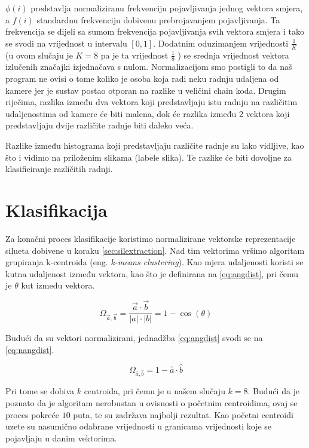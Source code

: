 \documentclass[times, utf8, diplomski]{fer}
\newcommand{\eng}[1]{(eng. \textit{#1})}
\begin{document}
$\phi(i)$ predstavlja normaliziranu frekvenciju pojavljivanja jednog vektora smjera, a $f(i)$ standardnu frekvenciju dobivenu prebrojavanjem pojavljivanja.
Ta frekvencija se dijeli sa sumom frekvencija pojavljivanja svih vektora smjera i tako se svodi na vrijednost u intervalu $[0, 1]$. Dodatnim oduzimanjem vrijednosti $ \frac{1}{K}$ (u ovom slučaju je $K=8$ pa je ta vrijednost $\frac{1}{8}$ ) se srednja vrijednost vektora izlučenih značajki izjednačava s nulom.
Normalizacijom smo postigli to da naš program ne ovisi o tome koliko je osoba koja radi neku radnju udaljena od kamere jer je sustav postao otporan
na razlike u veličini chain koda. Drugim riječima, razlika između dva vektora koji predstavljaju istu radnju na različitim udaljenostima od kamere će biti malena, dok će razlika između 2 vektora koji predstavljaju dvije različite radnje biti daleko veća.


Razlike između histograma koji predstavljaju različite radnje su lako vidljive, kao što i vidimo na priloženim slikama (labele slika). Te razlike će biti dovoljne za klasificiranje različitih radnji.

\section{Klasifikacija}

Za konačni proces klasifikacije koristimo normalizirane vektorske reprezentacije silueta dobivene u koraku \ref{sec:silextraction}. Nad tim vektorima vršimo algoritam grupiranja k-centroida \eng{k-means clustering}. Kao mjera udaljenosti koristi se kutna udaljenost između vektora, kao što je definirana na \ref{eq:angdist}, pri čemu je $\theta$ kut između vektora.

\begin{equation} \label{eq:angdist}
\Omega_{\vec{a},\vec{b}} = \frac{\vec{a} \cdot \vec{b}}{|a| \cdot |b|} = 1 - \cos(\theta)
\end{equation}

Budući da su vektori normalizirani, jednadžba \ref{eq:angdist} svodi se na \ref{eq:nangdist}.

\begin{equation} \label{eq:nangdist}
\Omega_{\hat{a},\hat{b}} = 1 - \hat{a} \cdot \hat{b}
\end{equation}

Pri tome se dobiva $k$ centroida, pri čemu je u našem slučaju $k = 8$. Budući da je poznato da je algoritam nerobustan u ovisnosti o početnim centroidima, ovaj se proces pokreće $10$ puta, te su zadržava najbolji rezultat. Kao početni centroidi uzete su nasumično odabrane vrijednosti u granicama vrijednosti koje se pojavljaju u danim vektorima.
\end{document}
